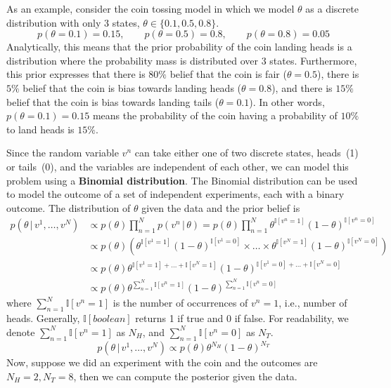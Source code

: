 \documentclass{article}
\newcommand{\giv}{\,|\,}
\begin{document}
As an example, consider the coin tossing model in which we model $\theta$ as a discrete distribution with only 3 states, $\theta \in \{0.1, 0.5, 0.8\}$. 
$$
    p(\theta = 0.1) = 0.15, \qquad p(\theta = 0.5) = 0.8, \qquad p(\theta = 0.8) = 0.05 
$$
\noindent Analytically, this means that the prior probability of the coin landing heads is a distribution where the probability mass is distributed over 3 states. Furthermore, this prior expresses that there is $80\%$ belief that the coin is fair ($\theta = 0.5$), there is $5\%$ belief that the coin is bias towards landing heads ($\theta = 0.8$), and there is $15\%$ belief that the coin is bias towards landing tails ($\theta = 0.1$). In other words, $p(\theta = 0.1) = 0.15$ means the probability of the coin having a probability of $10\%$ to land heads is $15\%$. 

Since the random variable $v^n$ can take either one of two discrete states, heads~(1) or tails~(0), and the variables are independent of each other, we can  model this problem using a \textbf{Binomial distribution}. The Binomial distribution can be used to model the outcome of a set of independent experiments, each with a binary outcome. The distribution of $\theta$ given the data and the prior belief is
\begin{align*}
    p(\theta \giv v^1, \dots, v^N) &\propto p(\theta) \prod_{n=1}^N p(v^n \giv \theta) = p(\theta) \prod_{n=1}^N \theta^{\mathbb{I}[v^n = 1]} (1-\theta)^{\mathbb{I}[v^n = 0]}\\[1em]
    &\propto p(\theta) \left( \theta^{\mathbb{I}[v^1 = 1]} (1-\theta)^{\mathbb{I}[v^1 = 0]} \times \dots \times \theta^{\mathbb{I}[v^N = 1]} (1-\theta)^{\mathbb{I}[v^N = 0]} \right) \\[1em] 
    &\propto p(\theta) \theta^{\mathbb{I}[v^1 = 1] + \dots + \mathbb{I}[v^N = 1]} (1-\theta)^{\mathbb{I}[v^1 = 0] + \dots + \mathbb{I}[v^N = 0]}\\[1em]
    &\propto p(\theta) \theta^{\sum_{n=1}^N \mathbb{I}[v^n = 1]} (1-\theta)^{\sum_{n=1}^N \mathbb{I}[v^n = 0]}
\end{align*}
\noindent where $\sum_{n=1}^N \mathbb{I}[v^n = 1]$ is the number of occurrences of $v^n = 1$, i.e., number of heads. Generally, $\mathbb{I}[boolean]$ returns 1 if true and 0 if false. For readability, we denote $\sum_{n=1}^N \mathbb{I}[v^n = 1]$ as $N_H$, and $\sum_{n=1}^N \mathbb{I}[v^n = 0]$ as $N_T$. 
$$
    p(\theta \giv v^1, \dots, v^N) \propto p(\theta) \theta^{N_H} (1-\theta)^{N_T}
$$
\noindent Now, suppose we did an experiment with the coin and the outcomes are $N_H = 2, N_T = 8$, then we can compute the posterior given the data. 
\end{document}
